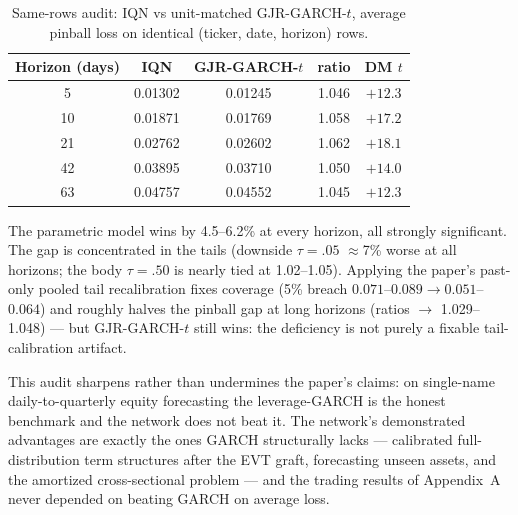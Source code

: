 \begin{table}[t]
\centering
\begin{threeparttable}
\caption{Same-rows audit: IQN vs unit-matched GJR-GARCH-$t$, average
pinball loss on identical (ticker, date, horizon) rows.}
\label{tab:samerows}
\begin{tabular}{ccccc}
\toprule
Horizon (days) & IQN & GJR-GARCH-$t$ & ratio & DM $t$ \\
\midrule
5  & 0.01302 & 0.01245 & 1.046 & $+12.3$ \\
10 & 0.01871 & 0.01769 & 1.058 & $+17.2$ \\
21 & 0.02762 & 0.02602 & 1.062 & $+18.1$ \\
42 & 0.03895 & 0.03710 & 1.050 & $+14.0$ \\
63 & 0.04757 & 0.04552 & 1.045 & $+12.3$ \\
\bottomrule
\end{tabular}
\begin{tablenotes}\footnotesize
\item The parametric model wins by 4.5--6.2\% at every horizon, all
strongly significant. The gap is concentrated in the tails (downside
$\tau{=}.05$ $\approx$7\% worse at all horizons; the body $\tau{=}.50$
is nearly tied at 1.02--1.05). Applying the paper's past-only pooled
tail recalibration fixes coverage (5\% breach $0.071$--$0.089 \to
0.051$--$0.064$) and roughly halves the pinball gap at long horizons
(ratios $\to$ 1.029--1.048) --- but GJR-GARCH-$t$ still wins: the
deficiency is not purely a fixable tail-calibration artifact.
\end{tablenotes}
\end{threeparttable}
\end{table}

This audit sharpens rather than undermines the paper's claims: on
single-name daily-to-quarterly equity forecasting the leverage-GARCH is
the honest benchmark and the network does not beat it. The network's
demonstrated advantages are exactly the ones GARCH structurally lacks
--- calibrated full-distribution term structures after the EVT graft,
forecasting unseen assets, and the amortized cross-sectional problem ---
and the trading results of Appendix~A never depended on beating GARCH on
average loss.


